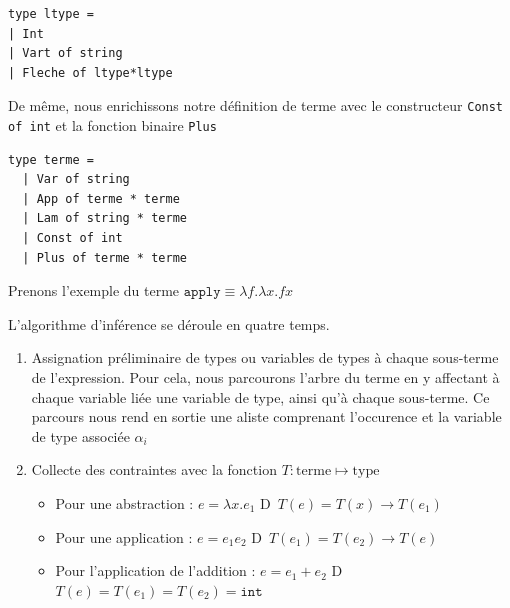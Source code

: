 \documentclass[11pt]{book}
\newcommand{\imp}{{\letterimp D}\hspace{0.1cm}}
\begin{document}
\begin{Verbatim}
type ltype = 
| Int 
| Vart of string
| Fleche of ltype*ltype
\end{Verbatim}

De même, nous enrichissons notre définition de terme avec le constructeur \verb+Const of int+ et la fonction binaire  \verb+Plus+ 
\begin{Verbatim}
type terme = 
  | Var of string 
  | App of terme * terme 
  | Lam of string * terme
  | Const of int
  | Plus of terme * terme
\end{Verbatim}

Prenons l'exemple du terme 
$\mathtt{apply} \equiv \lambda f . \lambda x .fx$

L'algorithme d'inférence se déroule en quatre temps.

\begin{enumerate}
  \item Assignation préliminaire de types ou variables de types à chaque sous-terme de l'expression.
  Pour cela, nous parcourons  l'arbre du terme en y affectant à chaque variable liée une variable de type, ainsi qu'à
  chaque sous-terme. Ce parcours nous rend en sortie une aliste comprenant l'occurence et la variable de type associée $\alpha_i$
 \begin{center} 
\end{center}

  \item Collecte des contraintes avec la fonction $T: \mathrm{terme} \mapsto \mathrm{type}$ 
    \begin{itemize}
      \item Pour une abstraction :  $e = \lambda x.e_1 $ \imp\ $T(e) = T(x) \rightarrow T(e_1) $
      \item Pour une application :  $e = e_1 e_2$ \imp\ $T(e_1) = T(e_2) \rightarrow T(e) $
      \item Pour l'application de l'addition  : $e=e_1+e_2$ \imp\ $T(e)= T(e_1) = T(e_2) = \mathtt{int} $
    \end{itemize}  


\end{enumerate}
\end{document}
